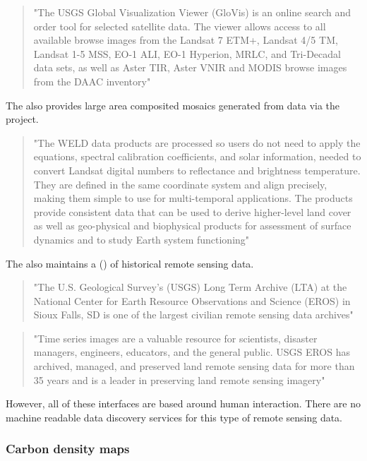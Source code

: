 \documentclass{article}
\begin{document}
\begin{quote}
"The USGS Global Visualization Viewer (GloVis) is an online search and order tool for
selected satellite data. The viewer allows access to all available browse images
from the Landsat 7 ETM+, Landsat 4/5 TM, Landsat 1-5 MSS, EO-1 ALI, EO-1 Hyperion,
MRLC, and Tri-Decadal data sets, as well as Aster TIR, Aster VNIR and MODIS browse
images from the DAAC inventory"
\end{quote}

The \cite{usgs} also provides large area composited mosaics generated from
\cite{landsat}
data via the
\cite{weld}
project.

\begin{quote}
"The WELD data products are processed so users do not need to apply the equations,
spectral calibration coefficients, and solar information, needed to convert Landsat
digital numbers to reflectance and brightness temperature.
They are defined in the same coordinate system and align precisely, making them simple
to use for multi-temporal applications.
The products provide consistent data that can be used to derive higher-level land
cover as well as geo-physical and biophysical products for assessment of surface
dynamics and to study Earth system functioning"
\end{quote}

The \cite{usgs} also maintains a
 (\cite{usgs-lta})
of historical remote sensing data.

\begin{quote}
"The U.S. Geological Survey's (USGS) Long Term Archive (LTA) at the National Center
for Earth Resource Observations and Science (EROS) in Sioux Falls, SD is one of
the largest civilian remote sensing data archives"
\end{quote}

\begin{quote}
"Time series images are a valuable resource for scientists, disaster managers,
engineers, educators, and the general public. USGS EROS has archived, managed,
and preserved land remote sensing data for more than 35 years and is a leader
in preserving land remote sensing imagery"
\end{quote}

However, all of these interfaces are based around human interaction.
There are no machine readable data discovery services for this type of remote sensing data.

\subsubsection{Carbon density maps}
\end{document}
